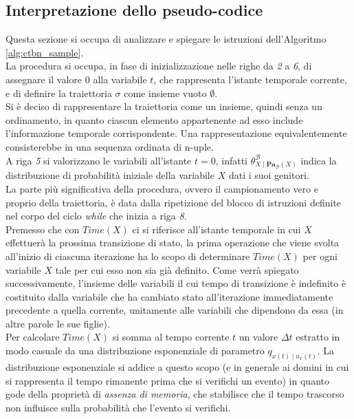   \subsection{Interpretazione dello pseudo-codice}
  Questa sezione si occupa di analizzare e spiegare le istruzioni dell'Algoritmo \ref{alg:ctbn_sample}.\\
  La procedura si occupa, in fase di inizializzazione nelle righe da \textit{2} a \textit{6}, 
  di assegnare il valore $0$ alla variabile $t$, che rappresenta l'istante temporale corrente, e di definire la traiettoria $\sigma$
  come insieme vuoto $\emptyset$.\\
  Si è deciso di rappresentare la traiettoria come un insieme, quindi senza un ordinamento, in quanto
  ciascun elemento appartenente ad esso include l'informazione temporale corrispondente. 
  Una rappresentazione equivalentemente consisterebbe in una sequenza ordinata di n-uple.\\
  A riga \textit{5} si valorizzano le variabili all'istante $t=0$, infatti $\theta^{\mathcal{B}}_{X \; | \; \mathbf{Pa}_{\mathcal{B}}(X)}$
  indica la distribuzione di probabilità iniziale della variabile $X$ dati i suoi genitori.\\ 
  La parte più significativa della procedura, ovvero il campionamento vero e proprio della 
  traiettoria, è data dalla ripetizione del blocco di istruzioni definite nel corpo
  del ciclo \textit{while} che inizia a riga \textit{8}.\\
  Premesso che con $Time(X)$ ci si riferisce all'istante temporale in cui $X$ effettuerà la prossima transizione di stato,
  la prima operazione che viene svolta all'inizio di ciascuna iterazione ha lo scopo di determinare $Time(X)$
  per ogni variabile $X$ tale per cui esso non sia già definito. Come verrà spiegato successivamente,
  l'insieme delle variabili il cui tempo di transizione è indefinito è costituito
  dalla variabile che ha cambiato stato all'iterazione immediatamente precedente a quella corrente, unitamente alle 
  variabili che dipendono da essa (in altre parole le sue figlie).\\
  Per calcolare $Time(X)$ si somma al tempo corrente $t$ un valore $\Delta t$ estratto in 
  modo casuale da una distribuzione esponenziale di parametro $q_{x(t) \; | \; u_x(t)}$.
  La distribuzione esponenziale si addice a questo scopo (e in generale ai domini in cui si rappresenta il tempo rimanente
  prima che si verifichi un evento) in quanto gode della proprietà di \textit{assenza di memoria},
  che stabilisce che il tempo trascorso non influisce sulla probabilità che l'evento si verifichi.
